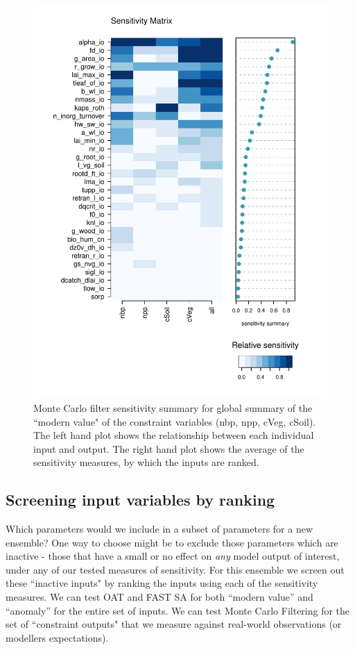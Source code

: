 \documentclass[gmd, manuscript]{copernicus}
\begin{document}
\begin{figure}[t]
\includegraphics[width=12cm]{./figs/fig10.pdf}
\caption{Monte Carlo filter sensitivity summary for global summary of the ``modern value" of the constraint variables (nbp, npp, cVeg, cSoil). The left hand plot shows the relationship between each individual input and output. The right hand plot shows the average of the sensitivity measures, by which the inputs are ranked.}
\label{fig:MCF_sensmat_Yconst_level1a_wave01}
\end{figure}

\subsection{Screening input variables by  ranking}\label{ssec:sa_ranking}

Which parameters would we include in a subset of parameters for a new ensemble?  One way to choose might be to exclude those parameters which are inactive - those that have a small or no effect on \emph{any} model output of interest, under any of our tested measures of sensitivity. For this ensemble we screen out these ``inactive inputs" by ranking the inputs using each of the sensitivity measures. We can test OAT and FAST SA for both ``modern value'' and ``anomaly'' for the entire set of inputs. We can test Monte Carlo Filtering for the set of ``constraint outputs" that we measure against real-world observations (or modellers expectations).
\end{document}
